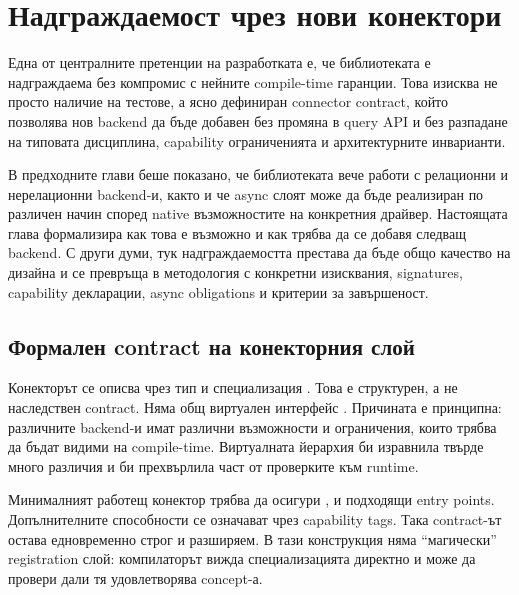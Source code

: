 \section{Надграждаемост чрез нови конектори}
\label{sec:verification_extensibility}

Една от централните претенции на разработката е, че библиотеката е надграждаема без компромис с нейните compile-time гаранции. Това изисква не просто наличие на тестове, а ясно дефиниран connector contract, който позволява нов backend да бъде добавен без промяна в query API и без разпадане на типовата дисциплина, capability ограниченията и архитектурните инварианти.

В предходните глави беше показано, че библиотеката вече работи с релационни и нерелационни backend-и, както и че async слоят може да бъде реализиран по различен начин според native възможностите на конкретния драйвер. Настоящата глава формализира как това е възможно и как трябва да се добавя следващ backend. С други думи, тук надграждаемостта престава да бъде общо качество на дизайна и се превръща в методология с конкретни изисквания, signatures, capability декларации, async obligations и критерии за завършеност.

\subsection{Формален contract на конекторния слой}

Конекторът се описва чрез тип  и специализация . Това е структурен, а не наследствен contract. Няма общ виртуален интерфейс . Причината е принципна: различните backend-и имат различни възможности и ограничения, които трябва да бъдат видими на compile-time. Виртуалната йерархия би изравнила твърде много различия и би прехвърлила част от проверките към runtime.

Минималният работещ конектор трябва да осигури ,  и подходящи  entry points. Допълнителните способности се означават чрез capability tags. Така contract-ът остава едновременно строг и разширяем. В тази конструкция няма ``магически'' registration слой: компилаторът вижда специализацията директно и може да провери дали тя удовлетворява  concept-а.


